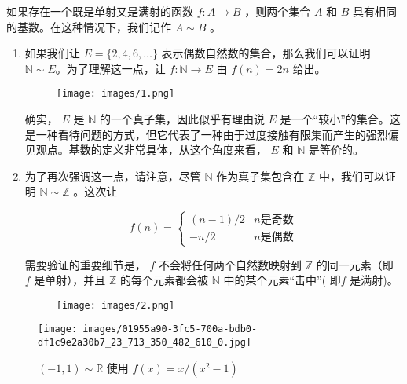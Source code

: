 \begin{Def}
  \label{def:1.4.7}
  如果存在一个既是单射又是满射的函数 \(f : A \rightarrow  B\) ，则两个集合 \(A\) 和 \(B\) 具有相同的基数。在这种情况下，我们记作 \(A \sim  B\) 。
\end{Def}

\begin{Eg}
  \label{eg:1.4.8}
  \begin{enumerate}[label = (\roman*)]
  \item 如果我们让 \(E = \{ 2,4,6,\ldots \}\) 表示偶数自然数的集合，那么我们可以证明 \(\mathbb{N} \sim  E\)。为了理解这一点，让 \(f : \mathbb{N} \rightarrow  E\) 由 \(f\left( n\right)  = {2n}\) 给出。

    \begin{figure}[h]
      \centering
      \texttt{[image: images/1.png]}
    \end{figure}

确实， \(E\) 是 \(\mathbb{N}\) 的一个真子集，因此似乎有理由说 \(E\) 是一个“较小”的集合。这是一种看待问题的方式，但它代表了一种由于过度接触有限集而产生的强烈偏见观点。基数的定义非常具体，从这个角度来看， \(E\) 和 \(\mathbb{N}\) 是等价的。
\item 为了再次强调这一点，请注意，尽管 \(\mathbb{N}\) 作为真子集包含在 \(\mathbb{Z}\) 中，我们可以证明 \(\mathbb{N} \sim  \mathbb{Z}\) 。这次让

\[
f\left( n\right)  = \left\{  \begin{array}{ll} \left( {n - 1}\right) /2 & n\text{是奇数} \\   - n/2 & n\text{是偶数} \end{array}\right.
\]

需要验证的重要细节是， \(f\) 不会将任何两个自然数映射到 \(\mathbb{Z}\) 的同一元素（即 $f$ 是单射），并且 \(\mathbb{Z}\) 的每个元素都会被 \(\mathbb{N}\) 中的某个元素“击中”( 即\(f\) 是满射)。

\begin{figure}[h]
  \centering
  \texttt{[image: images/2.png]}
\end{figure}


  \end{enumerate}
\end{Eg}

\begin{figure}[h]
  \centering
  \texttt{[image: images/01955a90-3fc5-700a-bdb0-df1c9e2a30b7\_23\_713\_350\_482\_610\_0.jpg]}
  \caption{ \(\left( {-1,1}\right)  \sim  \mathbb{R}\) 使用 \(f\left( x\right)  = x/\left( {{x}^{2} - 1}\right)\) }
  \label{fig:1.4}
\end{figure}


